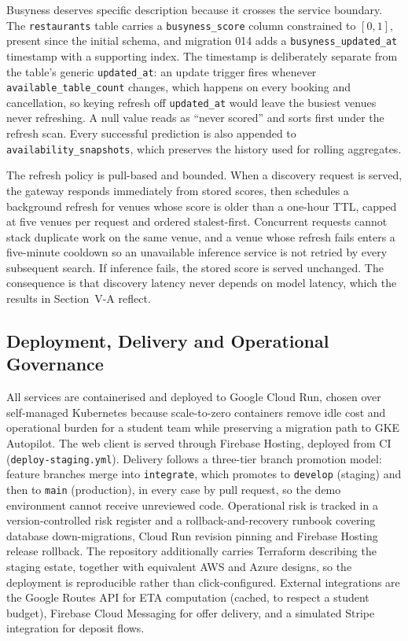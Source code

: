 \documentclass[conference]{IEEEtran}
\begin{document}
Busyness deserves specific description because it crosses the service boundary. The \texttt{restaurants} table carries a \texttt{busyness\_score} column constrained to $[0,1]$, present since the initial schema, and migration 014 adds a \texttt{busyness\_updated\_at} timestamp with a supporting index. The timestamp is deliberately separate from the table's generic \texttt{updated\_at}: an update trigger fires whenever \texttt{available\_table\_count} changes, which happens on every booking and cancellation, so keying refresh off \texttt{updated\_at} would leave the busiest venues never refreshing. A null value reads as ``never scored'' and sorts first under the refresh scan. Every successful prediction is also appended to \texttt{availability\_snapshots}, which preserves the history used for rolling aggregates.

The refresh policy is pull-based and bounded. When a discovery request is served, the gateway responds immediately from stored scores, then schedules a background refresh for venues whose score is older than a one-hour TTL, capped at five venues per request and ordered stalest-first. Concurrent requests cannot stack duplicate work on the same venue, and a venue whose refresh fails enters a five-minute cooldown so an unavailable inference service is not retried by every subsequent search. If inference fails, the stored score is served unchanged. The consequence is that discovery latency never depends on model latency, which the results in Section~V-A reflect.

\subsection{Deployment, Delivery and Operational Governance}

All services are containerised and deployed to Google Cloud Run, chosen over self-managed Kubernetes because scale-to-zero containers remove idle cost and operational burden for a student team while preserving a migration path to GKE Autopilot. The web client is served through Firebase Hosting, deployed from CI (\texttt{deploy-staging.yml}). Delivery follows a three-tier branch promotion model: feature branches merge into \texttt{integrate}, which promotes to \texttt{develop} (staging) and then to \texttt{main} (production), in every case by pull request, so the demo environment cannot receive unreviewed code. Operational risk is tracked in a version-controlled risk register and a rollback-and-recovery runbook covering database down-migrations, Cloud Run revision pinning and Firebase Hosting release rollback. The repository additionally carries Terraform describing the staging estate, together with equivalent AWS and Azure designs, so the deployment is reproducible rather than click-configured. External integrations are the Google Routes API for ETA computation (cached, to respect a student budget), Firebase Cloud Messaging for offer delivery, and a simulated Stripe integration for deposit flows.
\end{document}
